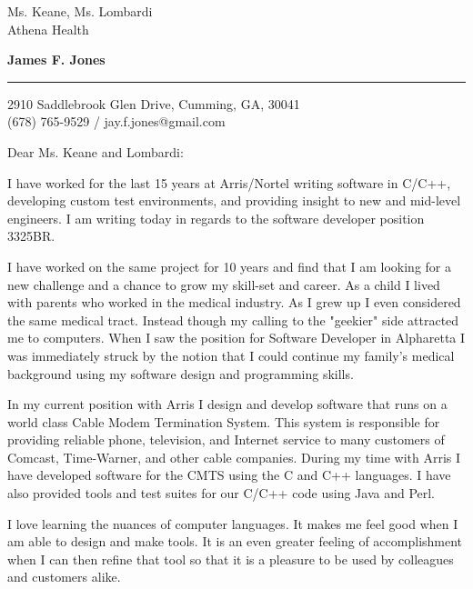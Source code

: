 \documentclass{letter} %
\begin{document}
\signature{James F. Jones}           %
\longindentation=0pt                       %
\let\raggedleft\raggedright                %
 
 
\begin{letter}{Ms. Keane, Ms. Lombardi\\
Athena Health
}


\begin{flushleft}
{\large\bf James F. Jones}
\end{flushleft}
\medskip\hrule height 1pt
\begin{flushright}
\hfill 2910 Saddlebrook Glen Drive, Cumming, GA, 30041\\
\hfill (678) 765-9529 / jay.f.jones@gmail.com
\end{flushright} 
\vfill %

\opening{Dear Ms. Keane and Lombardi:} 
 
\noindent 
I have worked for the last 15 years at Arris/Nortel
writing software in C/C++, developing custom test environments,
and providing insight to new and mid-level engineers.
I am writing today in regards to the software developer position
3325BR.

\noindent I have worked on the same project for 10 years and find
that I am looking for a new challenge and a chance to grow my 
skill-set and career.  As a child I lived with parents who worked
in the medical industry. As I grew up I even considered the same
medical tract.  Instead though my calling to the "geekier" side
attracted me to computers.  When I saw the position for Software 
Developer in Alpharetta I was immediately struck by the notion that 
I could continue my family's medical background using my software
design and programming skills.

In my current position with Arris I design and develop software
that runs on a world class Cable Modem Termination System. This
system is responsible for providing reliable phone, television, and Internet
service to many customers of Comcast, Time-Warner, and other 
cable companies. During my time with Arris I have developed software
for the CMTS using the C and C++ languages. I have also provided tools and test 
suites for our C/C++ code using Java and Perl.

I love learning the nuances of computer languages.  It makes me feel good 
when I am able to design and make tools.  It is an even greater
feeling of accomplishment when I can then refine that tool so that it is a
pleasure to be used by colleagues and customers alike.


\end{letter}
\end{document}
